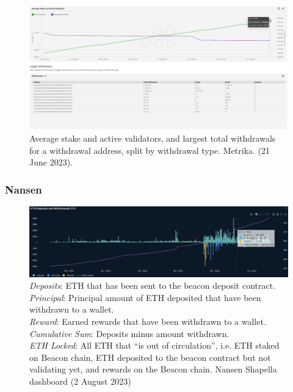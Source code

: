 \documentclass[UTF8]{article}
\begin{document}
\begin{figure}[htbp]
\begin{center}
\includegraphics[width=0.9\linewidth]{images/metrika6}
\caption{Average stake and active validators, and largest total withdrawals for a withdrawal address, split by withdrawal type.  Metrika. (21 June 2023). }
\label{fig:metrika6}
\end{center}
\end{figure}

\clearpage

\subsubsection*{Nansen}
\begin{figure}[htbp]
\begin{center}
\includegraphics[width=\linewidth]{images/nansen1}
\caption{\textit{Deposits}: ETH that has been sent to the beacon deposit contract.\\
\textit{Principal}: Principal amount of ETH deposited that have been withdrawn to a wallet.\\
\textit{Reward}: Earned rewards that have been withdrawn to a wallet.\\
\textit{Cumulative Sum}: Deposits minus amount withdrawn.\\
\textit{ETH Locked}: All ETH that ``is out of circulation'', i.e. ETH staked on Beacon chain, ETH deposited to the beacon contract but not validating yet, and
rewards on the Beacon chain. Nansen Shapella dashboard (2 August 2023)}
\label{fig:nansen1}
\end{center}
\end{figure}
\end{document}
